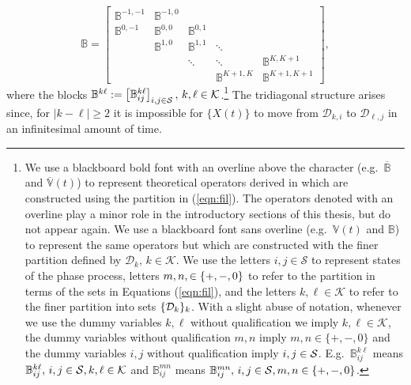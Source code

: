 \[\mathbb B = \left[
	\begin{array}{ccccc}
		\mathbb B^{{-1},{-1}}&\mathbb B^{{-1},0}& & & \\
		\mathbb B^{0,{-1}}&\mathbb B^{0,0}&\mathbb B^{0,1}&& \\
		&\mathbb B^{1,0}&\mathbb B^{1,1}&\ddots& \\
		& & \ddots & \ddots & \mathbb B^{K,{K+1}}\\
		& & & \mathbb B^{{K+1},K} & \mathbb B^{{K+1},{K+1}}
	\end{array}\right],\]
where the blocks \(\mathbb B^{k\ell}:= \begin{bmatrix} \mathbb B_{ij}^{k\ell} \end{bmatrix}_{i,j\in\mathcal S},\,k,\ell\in\mathcal K\).\footnote{We use a blackboard bold font with an overline above the character (e.g.~\(\overline{\mathbb B}\) and \(\overline{\mathbb V}(t)\)) to represent theoretical operators derived in \citep{bo2014} which are constructed using the partition in (\ref{eqn:fil}). The operators denoted with an overline play a minor role in the introductory sections of this thesis, but do not appear again. We use a blackboard font sans overline (e.g.~\(\mathbb V(t)\) and \(\mathbb B\)) to represent the same operators but which are constructed with the finer partition defined by \(\mathcal D_k,\,k\in\mathcal K\). We use the letters \(i,j\in\mathcal S\) to represent states of the phase process, letters \(m,n,\in\mathcal \{+,-,0\}\) to refer to the partition in terms of the sets in Equations (\ref{eqn:fil}), and the letters \(k,\ell\in\mathcal K\) to refer to the finer partition into sets \(\{\mathcal{D}_k\}_k\). With a slight abuse of notation, whenever we use the dummy variables \(k,\ell\) without qualification we imply \(k,\ell\in\mathcal K\), the dummy variables without qualification \(m,n\) imply \(m,n\in\{+,-,0\}\) and the dummy variables \(i,j\) without qualification imply \(i,j\in\mathcal{S}\). E.g.~\(\mathbb B_{ij}^{k\ell}\) means \(\mathbb B_{ij}^{k\ell},\, i,j\in\mathcal{S}, k,\ell\in\mathcal K\) and \(\mathbb B_{ij}^{mn}\) means \(\mathbb B_{ij}^{mn},\, i,j\in\mathcal{S}, m,n\in\{+,-,0\}\).
} The tridiagonal structure arises since, for \(|k-\ell|\geq2\) it is impossible for \(\{X(t)\}\) to move from \(\mathcal D_{k,i}\) to \(\mathcal D_{\ell,j}\) in an infinitesimal amount of time.

